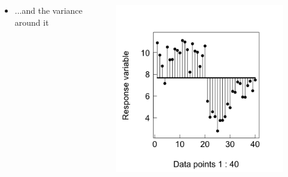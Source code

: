 \documentclass{beamer}
\begin{document}
\begin{frame}{}
  \begin{columns}[onlytextwidth] %
    \begin{column}{0.44\textwidth}
  \begin{itemize}
    \item ...and the variance around it
  \end{itemize}
    \end{column}
    \hspace{0.02\textwidth} %
    \begin{column}{0.6\textwidth}
      \begin{center}
        \includegraphics[width=0.9\textwidth]{lectures/day_1_intro_to_mems/figures/unnamed-chunk-19-1.png}
      \end{center}
    \end{column}
  \end{columns}
\end{frame}
\end{document}
